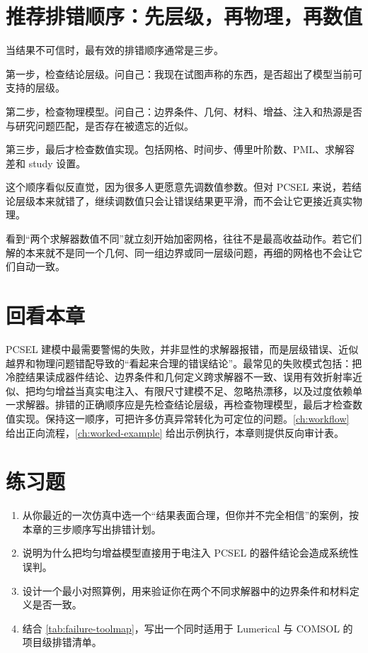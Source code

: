 \section{推荐排错顺序：先层级，再物理，再数值}
当结果不可信时，最有效的排错顺序通常是三步。

第一步，检查结论层级。问自己：我现在试图声称的东西，是否超出了模型当前可支持的层级。

第二步，检查物理模型。问自己：边界条件、几何、材料、增益、注入和热源是否与研究问题匹配，是否存在被遗忘的近似。

第三步，最后才检查数值实现。包括网格、时间步、傅里叶阶数、PML、求解容差和 study 设置。

这个顺序看似反直觉，因为很多人更愿意先调数值参数。但对 PCSEL 来说，若结论层级本来就错了，继续调数值只会让错误结果更平滑，而不会让它更接近真实物理。

\begin{PitfallBox}
看到“两个求解器数值不同”就立刻开始加密网格，往往不是最高收益动作。若它们解的本来就不是同一个几何、同一组边界或同一层级问题，再细的网格也不会让它们自动一致。
\end{PitfallBox}

\section*{回看本章}
PCSEL 建模中最需要警惕的失败，并非显性的求解器报错，而是层级错误、近似越界和物理问题错配导致的“看起来合理的错误结论”。最常见的失败模式包括：把冷腔结果读成器件结论、边界条件和几何定义跨求解器不一致、误用有效折射率近似、把均匀增益当真实电注入、有限尺寸建模不足、忽略热漂移，以及过度依赖单一求解器。排错的正确顺序应是先检查结论层级，再检查物理模型，最后才检查数值实现。保持这一顺序，可把许多仿真异常转化为可定位的问题。\cref{ch:workflow} 给出正向流程，\cref{ch:worked-example} 给出示例执行，本章则提供反向审计表。

\section*{练习题}
\begin{enumerate}
  \item \basicq 从你最近的一次仿真中选一个“结果表面合理，但你并不完全相信”的案例，按本章的三步顺序写出排错计划。

  \item \basicq 说明为什么把均匀增益模型直接用于电注入 PCSEL 的器件结论会造成系统性误判。

  \item \midq 设计一个最小对照算例，用来验证你在两个不同求解器中的边界条件和材料定义是否一致。

  \item \hardq 结合 \cref{tab:failure-toolmap}，写出一个同时适用于 Lumerical 与 COMSOL 的项目级排错清单。
\end{enumerate}

